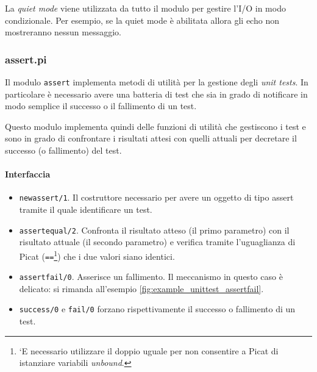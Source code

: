 \documentclass[12pt,a4paper,openright]{book} %
\begin{document}
La \emph{quiet mode} viene utilizzata da tutto il modulo per gestire
l'I/O in modo condizionale. Per esempio, se la quiet mode è abilitata
allora gli echo non mostreranno nessun messaggio.

\subsubsection{assert.pi}

Il modulo \texttt{assert} implementa metodi di utilità per la gestione
degli \emph{unit tests}. In particolare è necessario avere una
batteria di test che sia in grado di notificare in modo semplice il
successo o il fallimento di un test.

Questo modulo implementa quindi delle funzioni di utilità che
gestiscono i test e sono in grado di confrontare i risultati attesi
con quelli attuali per decretare il successo (o fallimento) del test.

\paragraph{Interfaccia}
\begin{itemize}
	\item \texttt{new\textunderscore assert/1}. Il costruttore
          necessario per avere un oggetto di tipo assert tramite il
          quale identificare un test.
	\item \texttt{assert\textunderscore equal/2}. Confronta il
          risultato atteso (il primo parametro) con il risultato
          attuale (il secondo parametro) e verifica tramite
          l'uguaglianza di Picat (\texttt{==}\footnote{`E necessario
            utilizzare il doppio uguale per non consentire a Picat di
            istanziare variabili \emph{unbound}.}) che i due valori
          siano identici.
	\item \texttt{assert\textunderscore fail/0}. Asserisce un
          fallimento. Il meccanismo in questo caso è delicato: si
          rimanda all'esempio \ref{fig:example_unittest_assertfail}.
	\item \texttt{success/0} e \texttt{fail/0} forzano
          rispettivamente il successo o fallimento di un test.
\end{itemize}
\end{document}
